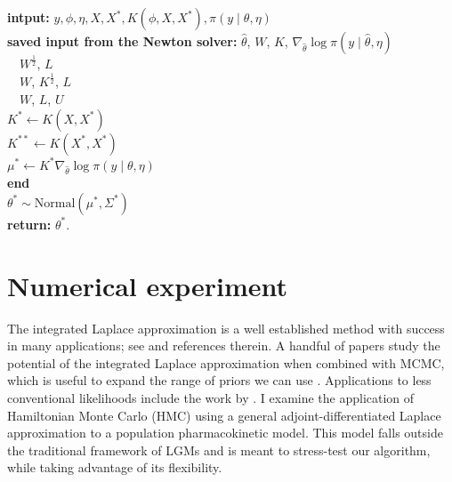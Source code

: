\documentclass[stslayout, noinfoline]{imsart}
\theoremstyle{definition}
\begin{document}
\begin{algorithm}
  \caption{Posterior draws for latent Gaussian $\theta^*$}
  \label{algo:post-sample}
  {\bf intput:} $y, \phi, \eta, X, X^*, K(\phi, X, X^*), \pi(y \mid \theta, \eta)$ \\
  {\bf saved input from the Newton solver:} $\hat \theta$, $W$, $K$, $\nabla_{\hat \theta} \log \pi(y \mid \hat \theta, \eta)$  \\
    \ \ $W^\frac{1}{2}$, $L$  \\
    \ \ $W$, $K^\frac{1}{2}$, $L$  \\
    \ \ $W$, $L$, $U$  \\
   $K^* \gets K(X, X^*)$  \\
   $K^{**} \gets K(X^*, X^*)$ \\
   $\mu^* \gets K^* \nabla_{\hat \theta} \log \pi(y \mid \theta, \eta)$ \\
   \textbf{end} \\
   $\theta^* \sim \text{Normal}(\mu^*, \Sigma^*)$ \\
   \textbf{return:} $\theta^*$.
\end{algorithm}

\section{Numerical experiment} \label{sec:gam-experiment}

The integrated Laplace approximation is a well established method with success in many applications; see \cite{Rue:2017} and references therein.
A handful of papers study the potential of the integrated Laplace approximation when combined with MCMC, which is useful to expand the range of priors we can use \citep[e.g.][]{Gomez:2018, Monnahan:2018, Margossian:2020-laplace}.
Applications to less conventional likelihoods include the work by \citet{Vanhatalo:2009, Jylanki:2011, Joensuu:2012, Riihimaki:2014, Vanhatalo:2021}.
%
I examine the application of Hamiltonian Monte Carlo (HMC) using a general adjoint-differentiated Laplace approximation to a population pharmacokinetic model.
This model falls outside the traditional framework of LGMs and is meant to stress-test our algorithm, while taking advantage of its flexibility.
\end{document}
